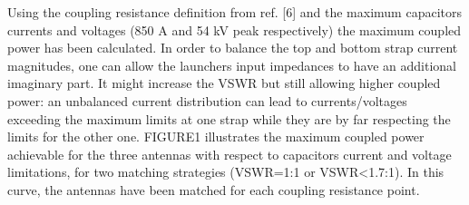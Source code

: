{Using the coupling resistance definition from ref. [6] and the maximum capacitors currents and voltages (850 A and 54 kV peak respectively) the maximum coupled power has been calculated. In order to balance the top and bottom strap current magnitudes, one can allow the launchers input impedances to have an additional imaginary part. It might increase the VSWR but still allowing higher coupled power: an unbalanced current distribution can lead to currents/voltages exceeding the maximum limits at one strap while they are by far respecting the limits for the other one. FIGURE1 illustrates the maximum coupled power achievable for the three antennas with respect to capacitors current and voltage limitations, for two matching strategies (VSWR=1:1 or VSWR<1.7:1). In this curve, the antennas have been matched for each coupling resistance point. 






 

}
